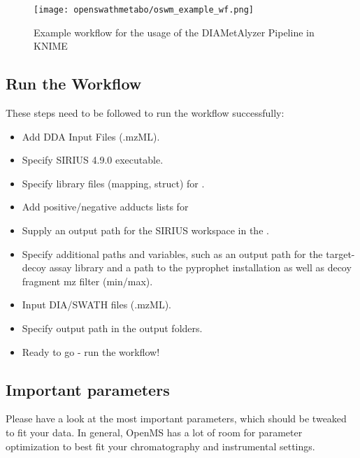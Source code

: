 \begin{figure}[!h]
  \centering
  \texttt{[image: openswathmetabo/oswm\_example\_wf.png]}
  \caption{Example workflow for the usage of the DIAMetAlyzer Pipeline in KNIME}
  \label{fig:oswm_example_wf}
\end{figure}

\subsection{Run the Workflow}
These steps need to be followed to run the workflow successfully:

\begin{itemize}
\item Add DDA Input Files (.mzML).
\item Specify SIRIUS 4.9.0 executable.
\item Specify library files (mapping, struct) for .
\item Add positive/negative adducts lists for 
\item Supply an output path for the SIRIUS workspace in the .
\item Specify additional paths and variables, such as an output path for the target-decoy assay library and a path to the pyprophet installation as well as decoy fragment mz filter (min/max).
\item Input DIA/SWATH files (.mzML).
\item Specify output path in the output folders.
\item Ready to go - run the workflow! 
\end{itemize}

\subsection{Important parameters}
\noindent Please have a look at the most important parameters, which should be tweaked to fit your data. In general, OpenMS has a lot of room for parameter optimization to best fit your chromatography and instrumental settings. \\

